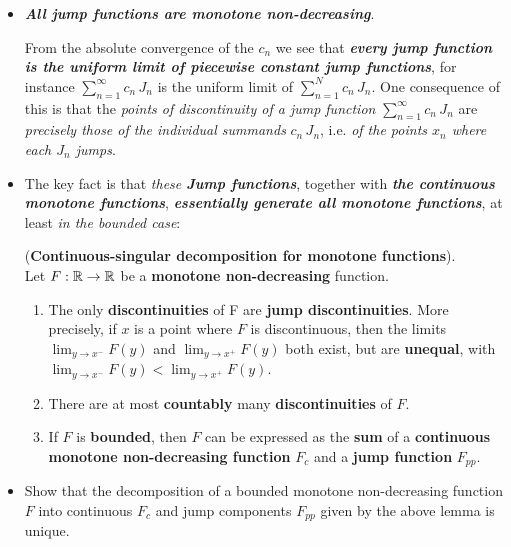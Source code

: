 \documentclass[11pt]{article}
\begin{document}
\begin{itemize}
\item \begin{remark}
\emph{\textbf{All jump functions are monotone non-decreasing}}.  

From the absolute convergence of the $c_n$ we see that \emph{\textbf{every jump function is the uniform limit of piecewise constant jump functions}}, for instance
$\sum_{n=1}^{\infty}c_n\,J_n$ is the uniform limit of $\sum_{n=1}^{N}c_n\,J_n$. One consequence of this is that the \emph{points of discontinuity of a jump function} $\sum_{n=1}^{\infty}c_n\,J_n$ are \emph{precisely those of the individual summands} $c_n\,J_n$, i.e. \emph{of the points $x_n$ where each $J_n$ jumps}.
\end{remark}

\item The key fact is that \emph{these \textbf{Jump functions}}, together with \emph{\textbf{the continuous monotone functions}}, \emph{\textbf{essentially generate all monotone functions}}, at least \emph{in the bounded case}:
\begin{lemma} (\textbf{Continuous-singular decomposition for monotone functions}). \\
Let $F : {\mathbb R} \rightarrow {\mathbb R}$ be a \textbf{monotone non-decreasing} function.
\begin{enumerate}
\item The only \textbf{discontinuities} of F are \textbf{jump discontinuities}. More precisely, if $x$ is a point where $F$ is discontinuous, then the
limits $\lim_{y\rightarrow x^{-}}F (y)$ and $\lim_{y\rightarrow x^{+}}F (y)$ both exist, but are \textbf{unequal}, with $\lim_{y\rightarrow x^{-}}F (y) < \lim_{y\rightarrow x^{+}}F (y)$.
\item There are at most \textbf{countably} many \textbf{discontinuities} of $F$.
\item If $F$ is \textbf{bounded}, then $F$ can be expressed as the \textbf{sum} of a \textbf{continuous} \textbf{monotone non-decreasing function} $F_c$ and a \textbf{jump function} $F_{pp}$.
\end{enumerate}
\end{lemma}

\item \begin{exercise}
Show that the decomposition of a bounded monotone non-decreasing function $F$ into continuous $F_c$ and jump components $F_{pp}$ given by the above lemma is unique.
\end{exercise}




\end{itemize}
\end{document}

